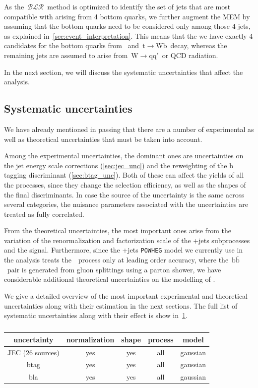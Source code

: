 As the~$\mathcal{BLR}$~method is optimized to identify the set of jets that are most compatible with arising from 4 bottom quarks, we further augment the MEM by assuming that the bottom quarks need to be considered only among those 4 jets, as explained in~\cref{sec:event_interpretation}. This means that the we have exactly 4 candidates for the bottom quarks from \Hbb~and~$\mathrm{t} \rightarrow \mathrm{W} \mathrm{b}$~decay, whereas the remaining jets are assumed to arise from~$\mathrm{W} \rightarrow \mathrm{q} \mathrm{q}'$~or QCD radiation. 

In the next section, we will discuss the systematic uncertainties that affect the analysis.

\subsection{Systematic uncertainties}
\label{sec:systematic_unc}
We have already mentioned in passing that there are a number of experimental as well as theoretical uncertainties that must be taken into account.

Among the experimental uncertainties, the dominant ones are uncertainties on the jet energy scale corrections (\cref{sec:jec_unc}) and the reweighting of the b tagging discriminant (\cref{sec:btag_unc}). Both of these can affect the yields of all the processes, since they change the selection efficiency, as well as the shapes of the final discriminants. In case the source of the uncertainty is the same across several categories, the nuisance parameters associated with the uncertainties are treated as fully correlated.

From the theoretical uncertainties, the most important ones arise from the variation of the renormalization and factorization scale of the \ttbar+jets subprocesses and the \ttH signal. Furthermore, since the \ttbar+jets \texttt{POWHEG} model we currently use in the analysis treats the~\ttbb~process only at leading order accuracy, where the~$\mathrm{b}\bar{\mathrm{b}}$~pair is generated from gluon splittings using a parton shower, we have considerable additional theoretical uncertainties on the modelling of \ttbb.

We give a detailed overview of the most important experimental and theoretical uncertainties along with their estimation in the next sections. The full list of systematic uncertainties along with their effect is show in~\cref{tab:systematic_uncertainties}.

\begin{table}[h!]

\begin{center}
\caption{}
\label{tab:systematic_uncertainties}
\begin{tabular}{c|cccc}
\hline
uncertainty & normalization & shape & process & model \\
\hline
JEC (26 sources) & yes & yes & all & gaussian \\
btag & yes & yes & all & gaussian \\
\hline
bla & yes & yes & all & gaussian \\
\hline
\hline
\end{tabular}
\end{center}
\end{table}

